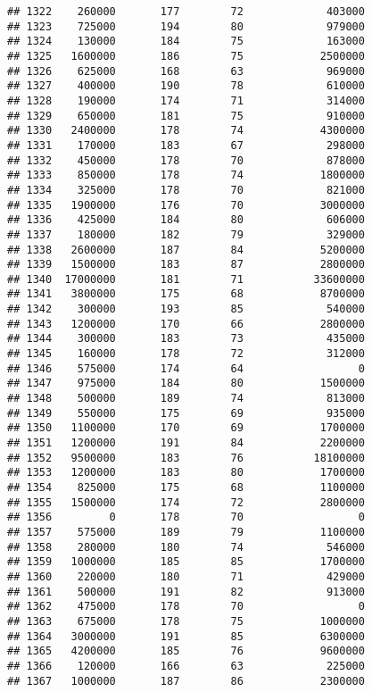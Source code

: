 \documentclass[
]{article}
\begin{document}
\begin{verbatim}
## 1322    260000       177        72             403000
## 1323    725000       194        80             979000
## 1324    130000       184        75             163000
## 1325   1600000       186        75            2500000
## 1326    625000       168        63             969000
## 1327    400000       190        78             610000
## 1328    190000       174        71             314000
## 1329    650000       181        75             910000
## 1330   2400000       178        74            4300000
## 1331    170000       183        67             298000
## 1332    450000       178        70             878000
## 1333    850000       178        74            1800000
## 1334    325000       178        70             821000
## 1335   1900000       176        70            3000000
## 1336    425000       184        80             606000
## 1337    180000       182        79             329000
## 1338   2600000       187        84            5200000
## 1339   1500000       183        87            2800000
## 1340  17000000       181        71           33600000
## 1341   3800000       175        68            8700000
## 1342    300000       193        85             540000
## 1343   1200000       170        66            2800000
## 1344    300000       183        73             435000
## 1345    160000       178        72             312000
## 1346    575000       174        64                  0
## 1347    975000       184        80            1500000
## 1348    500000       189        74             813000
## 1349    550000       175        69             935000
## 1350   1100000       170        69            1700000
## 1351   1200000       191        84            2200000
## 1352   9500000       183        76           18100000
## 1353   1200000       183        80            1700000
## 1354    825000       175        68            1100000
## 1355   1500000       174        72            2800000
## 1356         0       178        70                  0
## 1357    575000       189        79            1100000
## 1358    280000       180        74             546000
## 1359   1000000       185        85            1700000
## 1360    220000       180        71             429000
## 1361    500000       191        82             913000
## 1362    475000       178        70                  0
## 1363    675000       178        75            1000000
## 1364   3000000       191        85            6300000
## 1365   4200000       185        76            9600000
## 1366    120000       166        63             225000
## 1367   1000000       187        86            2300000

\end{verbatim}
\end{document}
